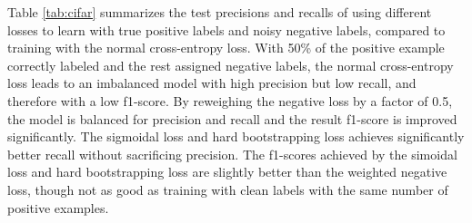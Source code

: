 
Table \ref{tab:cifar} summarizes the test precisions and recalls of using different losses to learn with true positive labels and noisy negative labels, compared to training with the normal cross-entropy loss.
With 50\% of the positive example correctly labeled and the rest assigned negative labels, the normal cross-entropy loss leads to an imbalanced model with high precision but low recall, and therefore with a low f1-score.
By reweighing the negative loss by a factor of 0.5, the model is balanced for precision and recall and the result f1-score is improved significantly.
The sigmoidal loss and hard bootstrapping loss achieves significantly better recall without sacrificing precision.
The f1-scores achieved by the simoidal loss and hard bootstrapping loss are slightly better than the weighted negative loss, though not as good as training with clean labels with the same number of positive examples.


